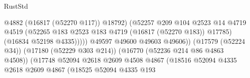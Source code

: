 \begin{lexlean}{RustStd}
\begin{coremodule}
                                                            @4882
                                                            (@16817 (@52270 @117))
                                                            @18792)
                                                          (@52257
                                                            @209
                                                            @104
                                                            @2523
                                                            @14
                                                            @4719
                                                            @4519
                                                            (@52265
                                                              @183
                                                              @2523
                                                              @183
                                                              @4719
                                                              (@16817 (@52270 @183))
                                                              @17785)
                                                            (@16834 @52198 @4335)))))
                                                    @49597
                                                    @49600
                                                    @49603
                                                    @49606))
                                                (@17579 (@52224 @34))
                                                (@17180 (@52229 @303 @214))
                                                (@16770 (@52236 @214 @86 @4863 @4508))
                                                (@17748
                                                  @52094
                                                  @2618
                                                  @2609
                                                  @4508
                                                  @4867
                                                  (@18516
                                                    @52094
                                                    @4335
                                                    @2618
                                                    @2609
                                                    @4867
                                                    (@18525
                                                      @52094
                                                      @4335
                                                      @193

\end{coremodule}
\end{lexlean}
